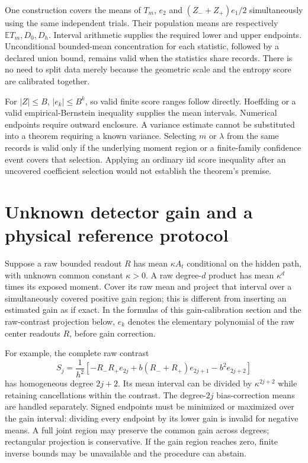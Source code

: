 One construction covers the means of $T_m$, $e_2$ and
$(Z_-+Z_+)e_1/2$ simultaneously using the same independent trials.  Their
population means are respectively $\mathbb ET_m,D_0,D_h$.  Interval
arithmetic supplies the required lower and upper endpoints.  Unconditional
bounded-mean concentration for each statistic, followed by a declared union
bound, remains valid when the statistics share records.  There is no need
to split data merely because the geometric scale and the entropy score are
calibrated together.

For $|Z|\le B$, $|e_k|\le B^k$, so valid finite score ranges follow directly.
Hoeffding or a valid empirical-Bernstein inequality supplies the mean
intervals.  Numerical endpoints require outward enclosure.  A variance
estimate cannot be substituted into a theorem requiring a known variance.
Selecting $m$ or $\lambda$ from the same records is valid only if the
underlying moment region or a finite-family confidence event covers that
selection.  Applying an ordinary iid score inequality after an uncovered
coefficient selection would not establish the theorem's premise.

\section{Unknown detector gain and a physical reference protocol}

Suppose a raw bounded readout $R$ has mean $\kappa A_t$ conditional on the
hidden path, with unknown common constant $\kappa>0$.  A raw degree-$d$
product has mean $\kappa^d$ times its exposed moment.  Cover its raw mean and
project that interval over a simultaneously covered positive gain region;
this is different from inserting an estimated gain as if exact.
In the formulas of this gain-calibration section and the raw-contrast
projection below, $e_k$ denotes the elementary polynomial of the raw center
readouts $R$, before gain correction.

For example, the complete raw contrast
\begin{equation}
 S_j=\frac1{h^2}\left[-R_-R_+e_{2j}
       +b(R_-+R_+)e_{2j+1}-b^2e_{2j+2}\right]
 \label{eq:dc-gain-contrast}
\end{equation}
has homogeneous degree $2j+2$.  Its mean interval can be divided by
$\kappa^{2j+2}$ while retaining cancellations within the contrast.  The
degree-$2j$ bias-correction means are handled separately.  Signed endpoints
must be minimized or maximized over the gain interval: dividing every
endpoint by its lower gain is invalid for negative means.  A full joint
region may preserve the common gain across degrees; rectangular projection
is conservative.  If the gain region reaches zero, finite inverse bounds
may be unavailable and the procedure can abstain.

